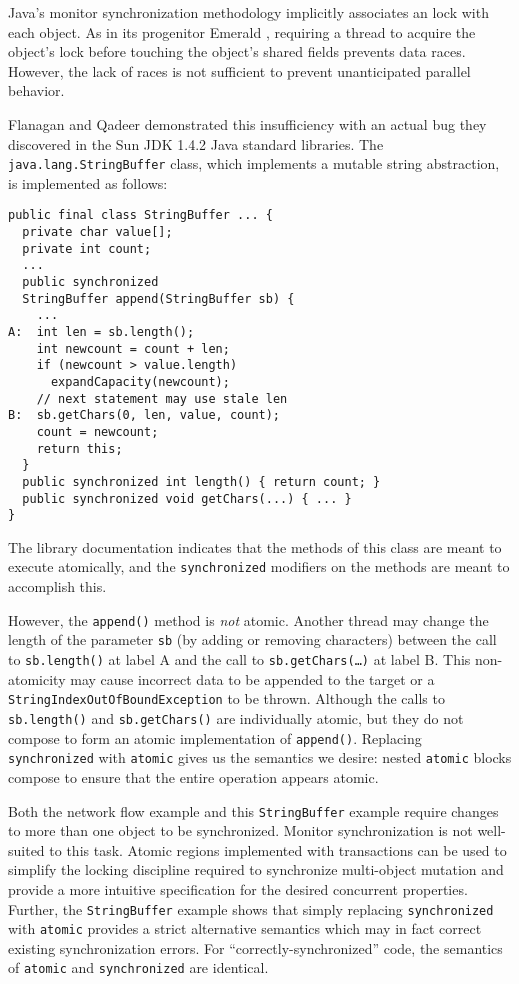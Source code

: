 \documentclass[preprint]{rdbacmconf}
\begin{document}
Java's monitor synchronization methodology implicitly associates an
lock with each object.  As in its progenitor Emerald
\cite{BlackHuJuLe86,JulSt91}, requiring a thread to acquire the
object's lock before touching the object's shared fields prevents data
races.  However, the lack of races is not sufficient to prevent unanticipated
parallel behavior.

Flanagan and Qadeer \cite{FlanaganQa03} demonstrated this
insufficiency with an
actual bug they discovered in the Sun JDK 1.4.2 Java standard
libraries.  The {\tt java.lang.StringBuffer} class,
which implements a mutable string abstraction, is implemented as follows:
\par {\footnotesize
\samepage
\begin{verbatim}
public final class StringBuffer ... {
  private char value[];
  private int count;
  ... 
  public synchronized
  StringBuffer append(StringBuffer sb) {
    ...
A:  int len = sb.length();
    int newcount = count + len; 
    if (newcount > value.length)
      expandCapacity(newcount);
    // next statement may use stale len
B:  sb.getChars(0, len, value, count);
    count = newcount;
    return this;
  }
  public synchronized int length() { return count; }
  public synchronized void getChars(...) { ... }
}
\end{verbatim}
}
The library documentation indicates that the methods of this class are meant
to execute atomically, and the {\tt synchronized} modifiers on the
methods are meant to accomplish this.

However, the {\tt append()} method is \emph{not} atomic.  Another
thread may change the length of the parameter \texttt{sb} (by adding
or removing characters) between the call to \texttt{sb.length()} at
label A and the call to \texttt{sb.getChars(\ldots)} at label B.
This non-atomicity may cause incorrect data to be appended to the
target or a \texttt{StringIndexOutOfBoundException} to be thrown. 
Although the calls to
\texttt{sb.length()} and \texttt{sb.getChars()} are individually
atomic, but they do not compose to form an atomic implementation of
\texttt{append()}.
Replacing {\tt synchronized} with {\tt atomic} gives us the semantics
we desire: nested {\tt atomic} blocks compose to ensure that the entire
operation appears atomic.

Both the network flow example and this {\tt StringBuffer} example require
changes to more than one object to be synchronized.
Monitor synchronization is not
well-suited to this task.  Atomic regions implemented with
transactions can be used to simplify the locking discipline required
to synchronize multi-object mutation
and provide a more intuitive specification for the desired
concurrent properties.  Further, the {\tt StringBuffer} example shows
that simply replacing {\tt synchronized} with {\tt atomic} provides a
strict alternative semantics which may in fact correct existing
synchronization errors.   For ``correctly-synchronized'' code, the
semantics of {\tt atomic} and {\tt synchronized} are identical.
\end{document}
